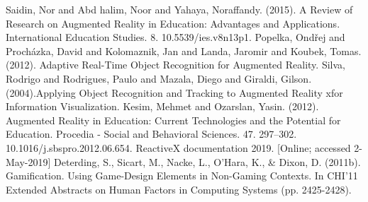 \documentclass[12 pct]{report}
\begin{document}
\begin{thebibliography}{3}
Saidin, Nor and Abd halim, Noor and Yahaya, Noraffandy. (2015). A Review of Research on Augmented Reality in Education: Advantages and Applications. International Education Studies. 8. 10.5539/ies.v8n13p1. 
Popelka, Ondřej and Procházka, David and Kolomaznik, Jan and Landa, Jaromir and Koubek, Tomas. (2012). Adaptive Real-Time Object Recognition for Augmented Reality. 
Silva, Rodrigo and Rodrigues, Paulo and Mazala, Diego and Giraldi, Gilson. (2004).Applying Object Recognition and Tracking to Augmented Reality xfor Information Visualization. 
Kesim, Mehmet and Ozarslan, Yasin. (2012). Augmented Reality in Education: Current Technologies and the Potential for Education. Procedia - Social and Behavioral Sciences. 47. 297–302. 10.1016/j.sbspro.2012.06.654. 
ReactiveX documentation 2019. [Online; accessed 2-May-2019]
Deterding, S., Sicart, M., Nacke, L., O'Hara, K., & Dixon, D. (2011b). Gamification. Using Game-Design Elements in Non-Gaming Contexts. In CHI'11 Extended Abstracts on Human Factors in Computing Systems (pp. 2425-2428).
\end{thebibliography}
\end{document}
